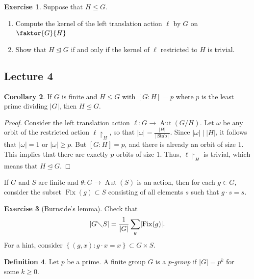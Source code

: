 \documentclass[10pt,letterpaper,cm]{nupset}
\theoremstyle{definition}
\newtheorem{definition}{Definition}[subsection]
\theoremstyle{theorem}
\newtheorem{corollary}[definition]{Corollary}
\newtheorem{exercise}[definition]{Exercise}
\theoremstyle{remark}
\newcommand{\1}{\mathbf{1}}
\newcommand{\0}{\vec 0}
\DeclareMathOperator{\aut}{Aut}
\DeclareMathOperator{\stab}{Stab}
\DeclareMathOperator{\fix}{Fix}
\begin{document}
\begin{exercise}{Suppose that $H \leq G$.}
\begin{enumerate}
\item Compute the kernel of the left translation action $\ell$ by $G$ on $\faktor{G}{H}$
\item Show that $H \unlhd G$  if and only if the kernel of $\ell$ restricted to $H$ is trivial. 
\end{enumerate}
\end{exercise}

\subsection{Lecture 4}

\begin{corollary} If $G$ is finite and $H\leq G$ with $[G:H] =p$ where $p$ is the least prime dividing $\lvert{G}\rvert$, then $H\unlhd G$.
\end{corollary}
\begin{proof}
Consider the left translation action $\ell : G \to \aut(G/H)$. Let $\omega$ be any orbit of the restricted action $\ell\restriction_H$, so that $\lvert{\omega}\rvert = \frac{\lvert{H}\rvert}{\lvert{\stab}\rvert}$. Since $\lvert{\omega}\rvert \mid \lvert{H}\rvert$, it follows that $\lvert{\omega}\rvert=1$ or $\lvert{\omega}\rvert \geq p$. But $[G:H] = p$, and there is already an orbit of size $1$. This implies that there are exactly $p$ orbits of size $1$. Thus, $\ell\restriction_H$ is trivial, which means that $H \unlhd G$.
\end{proof}

\smallskip

If $G$ and $S$ are finite and $\theta : G \to \aut(S)$ is an action, then for each $g\in G$, consider the subset $\fix(g) \subset S$ consisting of all elements $s$ such that $g \cdot s = s$.

\begin{exercise}[Burnside's lemma]   Check that $$\lvert{G \diagdown S}\rvert = \frac{1}{\lvert{G}\rvert} \sum_g \lvert{\fix(g)}\rvert.$$ For a hint, consider $\left\{(g,x): g \cdot x=x\right\} \subset G \times S$.
\end{exercise}
 
\begin{definition}
Let $p$ be a prime. A finite group $G$ is a \textit{$p$-group} if $\lvert{G}\rvert = p^k$ for some $k \geq 0$. 
\end{definition}
\end{document}
